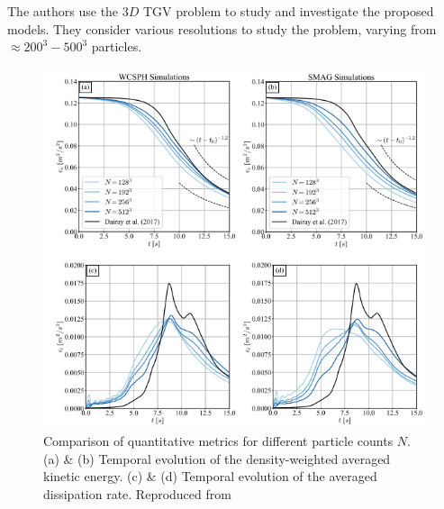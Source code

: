 The authors use the $3D$ TGV problem to study and investigate the proposed models. They consider various resolutions to study the problem, varying from $\approx 200^3 - 500^3$ particles.
\begin{figure}[H]
    \centering
    \includegraphics[scale=0.9]{Figures/research_papers/Okraschevski2022-fig-6.png}
    \caption{Comparison of quantitative metrics for different particle counts $N$. (a) \& (b) Temporal evolution of the density-weighted averaged kinetic energy. (c) \& (d) Temporal evolution of the averaged dissipation rate. Reproduced from \cite{Okraschevski2022}}
    \label{fig:Okraschevski2022-fig-6}
\end{figure}
